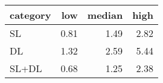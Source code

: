 \begin{tabular}{lrrr}
\hline
 category   &   low &   median &   high \\
\hline
 SL         &  0.81 &     1.49 &   2.82 \\
 DL         &  1.32 &     2.59 &   5.44 \\
 SL+DL      &  0.68 &     1.25 &   2.38 \\
\hline
\end{tabular}